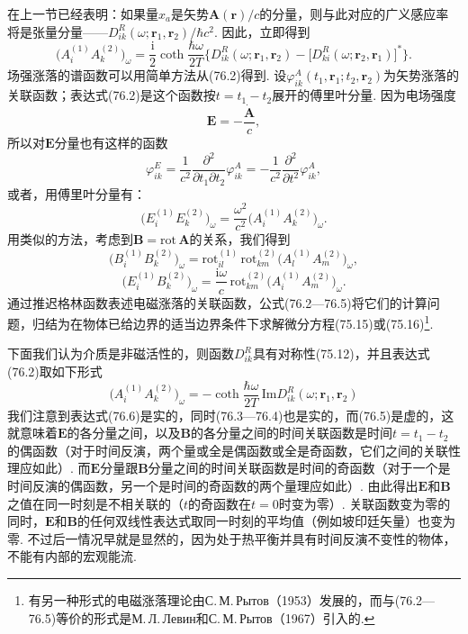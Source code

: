 在上一节已经表明：如果量$x_{a}$是矢势$\bm{A}(\bm{r})/c$的分量，则与此对应的广义感应率将是张量分量——$D_{ik}^{R}(\omega;\bm{r}_{1},\bm{r}_{2})/\hbar c^{2}$. 因此，立即得到
\begin{equation}
\bigl(A_{i}^{(1)}A_{k}^{(2)}\bigr)_{\omega}=\frac{\mathrm{i}}{2}\coth\frac{\hbar\omega}{2T}
\bigl\{D_{ik}^{R}(\omega;\bm{r}_{1},\bm{r}_{2})-\bigl[D_{ki}^{R}(\omega;\bm{r}_{2},\bm{r}_{1})\bigr]^{*}\bigr\}.
\end{equation}
场强涨落的谱函数可以用简单方法从(76.2)得到. 设$\varphi_{ik}^{A}(t_{1},\bm{r}_{1};t_{2},\bm{r}_{2})$为矢势涨落的关联函数；表达式(76.2)是这个函数按$t=t_{1}-t_{2}$展开的傅里叶分量. 因为电场强度
\begin{equation*}
\bm{E}=-\frac{\dot{\bm{A}}}{c},
\end{equation*}
所以对$\bm{E}$分量也有这样的函数
\begin{equation*}
\varphi_{ik}^{E}=\frac{1}{c^{2}}\frac{\partial^{2}}{\partial t_{1}\partial t_{2}}\varphi_{ik}^{A}=-\frac{1}{c^{2}}\frac{\partial^{2}}{\partial t^{2}}\varphi_{ik}^{A},
\end{equation*}
或者，用傅里叶分量有：
\begin{equation}
\bigl(E_{i}^{(1)}E_{k}^{(2)}\bigr)_{\omega}=\frac{\omega^{2}}{c^{2}}\bigl(A_{i}^{(1)}A_{k}^{(2)}\bigr)_{\omega}.
\end{equation}
用类似的方法，考虑到$\bm{B}=\mathrm{rot}\,\bm{A}$的关系，我们得到
\begin{equation}
\bigl(B_{i}^{(1)}B_{k}^{(2)}\bigr)_{\omega}=\mathrm{rot}_{il}^{(1)}\,\mathrm{rot}_{km}^{(2)}\bigl(A_{l}^{(1)}A_{m}^{(2)}\bigr)_{\omega},
\end{equation}
\begin{equation}
\bigl(E_{i}^{(1)}B_{k}^{(2)}\bigr)_{\omega}=\frac{\mathrm{i}\omega}{c}\,\mathrm{rot}_{km}^{(2)}\bigl(A_{i}^{(1)}A_{m}^{(2)}\bigr)_{\omega}.
\end{equation}
通过推迟格林函数表述电磁涨落的关联函数，公式(76.2—76.5)将它们的计算问题，归结为在物体已给边界的适当边界条件下求解微分方程(75.15)或(75.16)\footnote{有另一种形式的电磁涨落理论由С.\,М.\,Рытов（1953）发展的，而与(76.2—76.5)等价的形式是М.\,Л.\,Левин和С.\,М.\,Рытов（1967）引入的.}.

下面我们认为介质是非磁活性的，则函数$D_{ik}^{R}$具有对称性(75.12)，并且表达式(76.2)取如下形式
\begin{equation}
\bigl(A_{i}^{(1)}A_{k}^{(2)}\bigr)_{\omega}=-\coth\frac{\hbar\omega}{2T}\,\mathrm{Im}D_{ik}^{R}(\omega;\bm{r}_{1},\bm{r}_{2})
\end{equation}
我们注意到表达式(76.6)是实的，同时(76.3—76.4)也是实的，而(76.5)是虚的，这就意味着$\bm{E}$的各分量之间，以及$\bm{B}$的各分量之间的时间关联函数是时间$t=t_{1}-t_{2}$的偶函数（对于时间反演，两个量或全是偶函数或全是奇函数，它们之间的关联性理应如此）. 而$\bm{E}$分量跟$\bm{B}$分量之间的时间关联函数是时间的奇函数（对于一个是时间反演的偶函数，另一个是时间的奇函数的两个量理应如此）. 由此得出$\bm{E}$和$\bm{B}$之值在同一时刻是不相关联的（$t$的奇函数在$t=0$时变为零）. 关联函数变为零的同时，$\bm{E}$和$\bm{B}$的任何双线性表达式取同一时刻的平均值（例如坡印廷矢量）也变为零. 不过后一情况早就是显然的，因为处于热平衡并具有时间反演不变性的物体，不能有内部的宏观能流.

